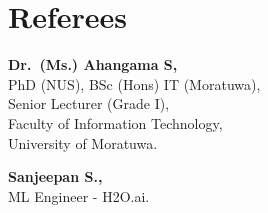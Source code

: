 \documentclass[a4paper,20pt]{article}
\begin{document}
\section*{Referees}
\vspace{-8pt}
\begin{minipage}[t]{0.48\textwidth}
\textbf{Dr.\ (Ms.) Ahangama S,}\\
PhD (NUS), BSc (Hons) IT (Moratuwa),\\
Senior Lecturer (Grade I),\\
Faculty of Information Technology,\\
University of Moratuwa.
\end{minipage}\hfill
\begin{minipage}[t]{0.48\textwidth}
\textbf{Sanjeepan S.,}\\
ML Engineer - H2O.ai.\\
\end{minipage}
\end{document}
